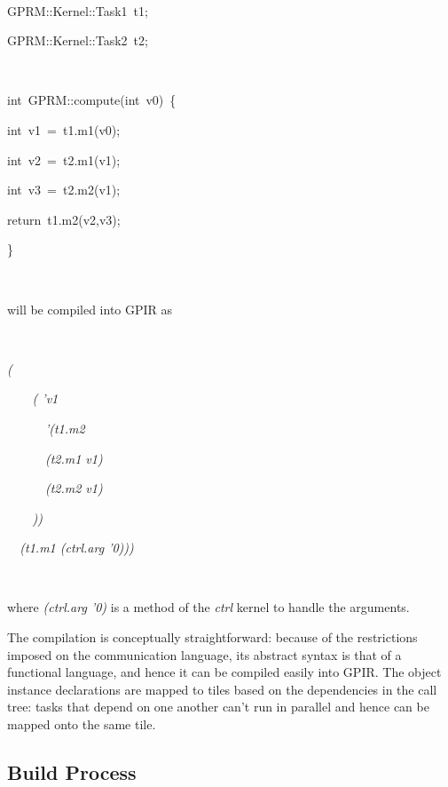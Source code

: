 \documentclass[copyright,creativecommons]{eptcs}
\newenvironment{lyxcode}
{\par\begin{list}{}{
\setlength{\rightmargin}{\leftmargin}
\setlength{\listparindent}{0pt}\raggedright
\setlength{\itemsep}{0pt}
\setlength{\parsep}{0pt}
\normalfont\ttfamily}\item[]}
{\end{list}}
\begin{document}
~
\begin{lyxcode}
{\small GPRM::Kernel::Task1~t1;}{\small \par}

{\small GPRM::Kernel::Task2~t2;}{\small \par}

~

{\small int~GPRM::compute(int~v0)~\{}{\small \par}

{\small int~v1~=~t1.m1(v0);}{\small \par}

{\small int~v2~=~t2.m1(v1);~}{\small \par}

{\small int~v3~=~t2.m2(v1);~}{\small \par}

{\small return~t1.m2(v2,v3);}{\small \par}

{\small \}}{\small \par}

~
\end{lyxcode}
will be compiled into GPIR as

~

\textit{( }

\textit{~~~~( 'v1}

\textit{~~~~~~'(t1.m2 }

\textit{~~~~~~(t2.m1 v1)}

\textit{~~~~~~(t2.m2 v1)}

\textit{~~~~))}

\textit{~~(t1.m1 (ctrl.arg '0)))}

~

where \textit{(ctrl.arg '0)} is a method of the \emph{ctrl} kernel
to handle the arguments. 

The compilation is conceptually straightforward: because of the restrictions
imposed on the communication language, its abstract syntax is that
of a functional language, and hence it can be compiled easily into
GPIR. The object instance declarations are mapped to tiles based on
the dependencies in the call tree: tasks that depend on one another
can't run in parallel and hence can be mapped onto the same tile. 


\subsection{Build Process}
\end{document}
